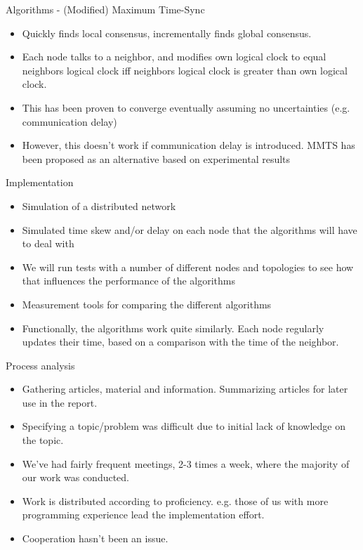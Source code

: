 \documentclass{beamer}
\begin{document}
\begin{frame}{Algorithms - (Modified) Maximum Time-Sync}
    \begin{itemize}
        \item Quickly finds local consensus, incrementally finds global consensus.
        \item Each node talks to a neighbor, and modifies own logical clock to equal neighbors logical clock iff neighbors logical clock is greater than own logical clock.
        \item This has been proven to converge eventually assuming no uncertainties (e.g. communication delay) \cite{HeChengShiChen11}
        \item However, this doesn't work if communication delay is introduced. MMTS has been proposed as an alternative based on experimental results \cite{HeLiChenCheng13}
    \end{itemize}
\end{frame}

\begin{frame}{Implementation}
   \begin{itemize}
       \item Simulation of a distributed network
       \item Simulated time skew and/or delay on each node that the algorithms will have to deal with
       \item We will run tests with a number of different nodes and topologies to see how that influences the performance of the algorithms
       \item Measurement tools for comparing the different algorithms
       \item Functionally, the algorithms work quite similarly. Each node regularly updates their time, based on a comparison with the time of the neighbor.
   \end{itemize} 
\end{frame}
 
\begin{frame}{Process analysis}
    \begin{itemize}
        \item Gathering articles, material and information. Summarizing articles for later use in the report.
        \item Specifying a topic/problem was difficult due to initial lack of knowledge on the topic. 
        \item We've had fairly frequent meetings, 2-3 times a week, where the majority of our work was conducted. 
        \item Work is distributed according to proficiency. 
        e.g. those of us with more programming experience lead the implementation effort.
        \item Cooperation hasn't been an issue.
    \end{itemize}
\end{frame}
\end{document}
